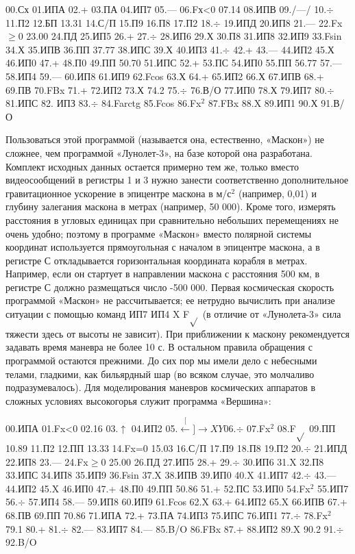 \documentclass[11pt,a4paper,oneside]{article}
\def\XY{$\stackrel[\leftarrow]{\rightarrow}{XY}$}
\begin{document}
00.Сх 01.ИПА 02.+ 03.ПА 04.ИП7 05.— 06.Fх<0 07.14 08.ИПВ 09./—/
10.$\div$ 11.П2 12.БП 13.31 14.С/П 15.П9 16.П8 17.П2 18.$\div$ 19.ИПД 20.ИП8 21.— 22.Fx$\geq$0 23.00 24.ПД 25.ИП5 26.+
27.$\div$ 28.ИП6 29.Х 30.П8 31.ИП8
32.ИП9 33.Fsin 34.Х 35.ИПВ 36.ПП 37.77 38.ИПС 39.Х 40.ИП3 41.$\div$ 42.+
43.— 44.ИП2 45.Х 46.ИП0 47.+ 48.П0 49.ПП 50.70 51.ИПС 52.+	53.ПС
54.ИП0 55.ПП 56.77 57.— 58.ИП4 59.— 60.ИП8 61.ИП9 62.Fcos 63.Х 64.+ 65.ИП2 66.Х 67.ИПВ 68.+ 69.ПВ
70.FBx 71.+ 72.ИП2 73.Х 74.2 75.$\div$ 76.В/О 77.ИП0 78.Х 79.ИП7 80.$\div$
81.ИПС 82. ИПЗ 83.$\div$ 84.Farctg 85.Fcos 86.Fx$^{2}$ 87.FBx 88.X 89.ИП1 90.Х 91.В/О

Пользоваться этой программой (называется она, естественно, «Маскон») не сложнее, чем программой «Лунолет-3», на базе которой она разработана. Комплект исходных данных остается примерно тем же, только вместо видеосообщений в регистры 1 и 3 нужно занести соответственно дополнительное гравитационное ускорение в эпицентре маскона в м/с$^{2}$ (например, 0,01) и глубину залегания маскона в метрах (например, 50 000). Кроме того, измерять расстояния в угловых единицах при сравнительно небольших перемещениях не очень удобно; поэтому в программе «Маскон» вместо полярной системы координат используется прямоугольная с началом в эпицентре маскона, а в регистре С откладывается горизонтальная координата корабля в метрах. Например, если он стартует в направлении маскона с расстояния 500 км, в регистре С должно размещаться число -500 000. Первая космическая скорость программой «Маскон» не рассчитывается; ее нетрудно вычислить при анализе ситуации с помощью команд ИП7 ИП4 X F$\sqrt{}$ (в отличие от «Лунолета-3» сила тяжести здесь от высоты не зависит). При приближении к маскону рекомендуется задавать время маневра не более 10 с. В остальном правила обращения с программой остаются прежними.
До сих пор мы имели дело с небесными телами, гладкими, как бильярдный шар (во всяком случае, это молчаливо подразумевалось). Для моделирования маневров космических аппаратов в сложных условиях высокогорья служит программа «Вершина»:

00.ИПА 01.Fx<0 02.16 03.$\uparrow$ 04.ИП2 05.\XY 06.$\div$ 07.Fx$^{2}$ 08.F$\sqrt{}$ 09.ПП 10.89 11.П2 12.ПП 13.33 14.Fx=0	15.03 16.С/П 17.П9 18.П8 19.П2 20.$\div$ 21.ИПД 22.ИП8 23.— 24.Fx$\geq$0 25.00
26.ПД 27.ИП5 28.+ 29.$\div$ 30.ИП6 31.X 32.П8 33.ИПС 34.ИП8 35.ИП9 36.Fsin 37.X 38.ИПВ 39.ИП0 40.X 41.ИП7
42.$\div$ 43.— 44.ИП2 45.X 46.ИП0 47.+
48.П0 49.ПП 50.86 51.+ 52.ПС 53.ИП0 54.Fx$^{2}$ 55.ИП7 56.$\div$ 57.ИП4	58.—
59.ИП8 60.ИП9 61.Fcos 62.X 63.+
64.ИП2 65.X 66.ИПВ 67.+ 68.ПВ
69.ПП 70.86 71.ИПА 72.+ 73.ПА
74.ИП3 75.ИПС 76.ИП1 77.$\div$ 78.Fx$^{2}$ 79.1 80.+ 81.$\div$ 82.— 83.ИП7 84.— 85.B/O 86.FBx 87.+ 88.ИП2 89.X 90.2
91.$\div$ 92.B/O
\end{document}
